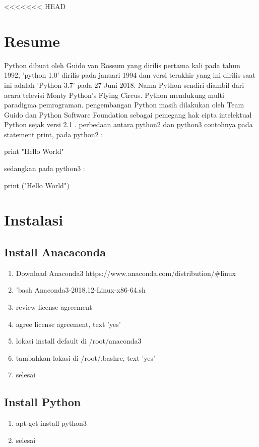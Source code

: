 <<<<<<< HEAD


\section{Resume}
\begin{flushleft}
\qquad Python dibuat oleh Guido van Rossum yang dirilis pertama  kali pada tahun 1992, 'python 1.0' dirilis pada januari 1994 dan versi terakhir yang ini dirilis saat ini adalah 'Python 3.7' pada 27 Juni 2018. Nama Python sendiri diambil dari acara televisi Monty Python's Flying Circus. Python mendukung multi paradigma pemrograman. pengembangan Python masih dilakukan oleh Team Guido dan Python Software Foundation sebagai pemegang hak cipta intelektual Python sejak versi 2.1 . perbedaan antara python2 dan python3 contohnya pada statement print, pada python2 : 

print "Hello World"

sedangkan pada python3 :

print ("Hello World")
\end{flushleft}

\section{Instalasi}
\subsection{Install Anacaconda}
\begin{enumerate}
\item Download Anaconda3 https://www.anaconda.com/distribution/#linux
\item 'bash Anaconda3-2018.12-Linux-x86-64.sh
\item review license agreement
\item agree license agreement, text 'yes'
\item lokasi install default di /root/anaconda3
\item tambahkan lokasi di /root/.bashrc, text 'yes'
\item selesai
\end{enumerate}

\subsection{Install Python}
\begin{enumerate}
\item apt-get install python3
\item selesai
\end{enumerate}

